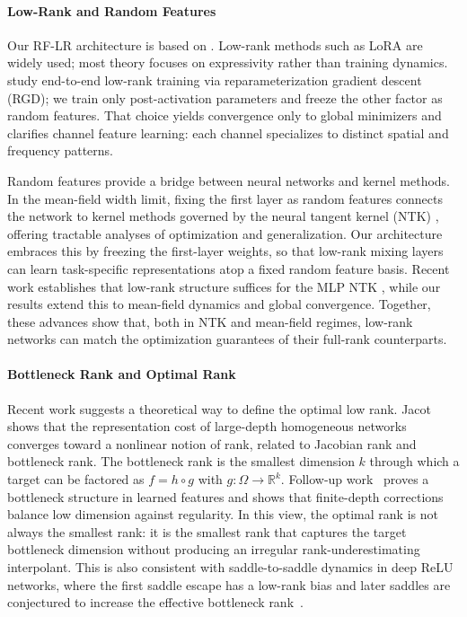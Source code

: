 \documentclass[nohyperref]{article}
\theoremstyle{plain}
\theoremstyle{definition}
\theoremstyle{remark}
\begin{document}
\paragraph{Low-Rank and Random Features}

Our RF-LR architecture is based on \cite{zhang2025structuredbalancedmulticomponentmultilayer}. Low-rank methods such as LoRA \cite{hu2021loralowrankadaptationlarge} are widely used; most theory focuses on expressivity rather than training dynamics. \cite{kamalakara2022exploringlowranktraining} study end-to-end low-rank training via reparameterization gradient descent (RGD); we train only post-activation parameters and freeze the other factor as random features. That choice yields convergence only to global minimizers and clarifies channel feature learning: each channel specializes to distinct spatial and frequency patterns.

Random features provide a bridge between neural networks and kernel methods. In the mean-field width limit, fixing the first layer as random features connects the network to kernel methods governed by the neural tangent kernel (NTK) \cite{jacot2018neural}, offering tractable analyses of optimization and generalization. Our architecture embraces this by freezing the first-layer weights, so that low-rank mixing layers can learn task-specific representations atop a fixed random feature basis. Recent work establishes that low-rank structure suffices for the MLP NTK \cite{author2024lowrankntk}, while our results extend this to mean-field dynamics and global convergence. Together, these advances show that, both in NTK and mean-field regimes, low-rank networks can match the optimization guarantees of their full-rank counterparts.

\paragraph{Bottleneck Rank and Optimal Rank}

Recent work suggests a theoretical way to define the optimal low rank. Jacot~\cite{jacot2022implicitrank} shows that the representation cost of large-depth homogeneous networks converges toward a nonlinear notion of rank, related to Jacobian rank and bottleneck rank. The bottleneck rank is the smallest dimension $k$ through which a target can be factored as $f=h\circ g$ with $g:\Omega\to\mathbb{R}^k$. Follow-up work~\cite{jacot2023bottleneck} proves a bottleneck structure in learned features and shows that finite-depth corrections balance low dimension against regularity. In this view, the optimal rank is not always the smallest rank: it is the smallest rank that captures the target bottleneck dimension without producing an irregular rank-underestimating interpolant. This is also consistent with saddle-to-saddle dynamics in deep ReLU networks, where the first saddle escape has a low-rank bias and later saddles are conjectured to increase the effective bottleneck rank~\cite{bantzis2025saddle}.
\end{document}
